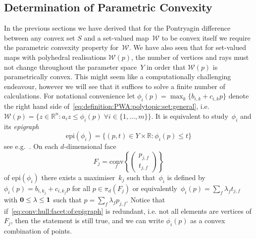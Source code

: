 \documentclass{elsarticle}
\providecommand{\conv}{\text{conv}}
\providecommand{\epi}{\text{epi}}
\theoremstyle{remark}
\theoremstyle{definition}
\begin{document}
\subsection{Determination of Parametric Convexity}
In the previous sections we have derived that for the Pontryagin difference between any convex set $S$ and a set-valued map~$\mathcal W$ to be convex itself we require the parametric convexity property for~$\mathcal W$.
%
We have also seen that for set-valued maps with polyhedral realisations $\mathcal W(p)$, the number of vertices and rays must not change throughout the parameter space~$Y$ in order that $\mathcal W(p)$ is parametrically convex.
%
This might seem like a computationally challenging endeavour, however we will see that it suffices to solve a finite number of calculations.
%
For notational convenience let $\phi_i(p) = \max_k\{b_{i,k}+c_{i,k}p\}$ denote the right hand side of~\eqref{eq:definition:PWA:polytopic:set:general}, i.e. $\mathcal W(p) = \{z\in\mathbb R^n: a_i z\leq \phi_i(p)\;\forall i\in\{1,\dots,m\}\}$.
%
It is equivalent to study~$\phi_i$ and its \emph{epigraph} 
%
$$
	\epi(\phi_i) = \{(p,t)\in Y\times\mathbb R: \phi_i(p)\leq t\}
$$
%
see e.g.~\cite{Gorokhovik:1993}.
%
On each $d$-dimensional face 
%
\begin{equation}\label{eq:conv:hull:facet:of:epigraph}
F_j = \underset{f}{\conv}\left\{\left(\begin{array}{c}p_{j,f}\\ t_{j,f}\end{array}\right)\right\}
\end{equation}
%
of $\epi(\phi_i)$ there exists a maximiser~$k_j$ such that~$\phi_i$ is defined by~$\phi_i(p)=b_{i,k_j}+c_{i,k_j}p$ for all $p\in\pi_d(F_j)$ or equivalently~$\phi_i(p)=\sum_{f}\lambda_f t_{j,f}$ with ${\bf{0}}\leq\lambda\leq{\bf{1}}$ such that $p=\sum_{f}\lambda_f p_{j,f}$.
%
Notice that if~\eqref{eq:conv:hull:facet:of:epigraph} is redundant, i.e. not all elements are vertices of $F_j$, then the statement is still true, and we can write $\phi_i(p)$ as a convex combination of points.
\end{document}
